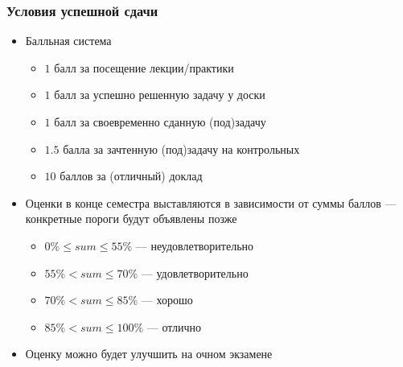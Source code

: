 \documentclass{beamer}
\begin{document}
\begin{frame}[fragile]
  \transwipe[direction=90]
  \frametitle{Условия успешной сдачи}
  \begin{itemize}
    \item Балльная система
    \begin{itemize}
      \item $1$ балл за посещение лекции/практики
      \item $1$ балл за успешно решенную задачу у доски 
      \item $1$ балл за своевременно сданную (под)задачу
      \item $1.5$ балла за зачтенную (под)задачу на контрольных
      \item $10$ баллов за (отличный) доклад
    \end{itemize}
    \item Оценки в конце семестра выставляются в зависимости от суммы баллов 
--- конкретные пороги будут объявлены позже
    \pause
    \begin{itemize}
      \item $0  \% \le sum \le 55 \%$ --- неудовлетворительно
      \item $55 \% < sum \le 70 \%$ --- удовлетворительно
      \item $70 \% < sum \le 85 \%$ --- хорошо
      \item $85 \% < sum \le 100 \%$ --- отлично
    \end{itemize}
  \end{itemize}
  \begin{itemize}
    \item Оценку можно будет улучшить на очном экзамене
  \end{itemize}
\end{frame}
\end{document}
